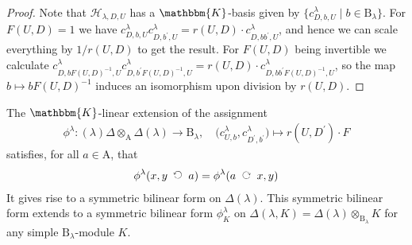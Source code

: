 \documentclass[a4paper,11pt]{amsart}
\newcommand{\actsleft}{\mathop{\,\;\raisebox{1.7ex}{\rotatebox{-90}{$\circlearrowright$}}\;\,}}
\newcommand{\actsright}{\mathop{\,\;\raisebox{0ex}{\rotatebox{90}{$\circlearrowleft$}}\;\,}}
\newcommand{\setstuff}[1]{\mathrm{#1}}
\newcommand{\hcirc}{\otimes}
\newcommand{\KK}{\mathbbm{K}}
\numberwithin{equation}{section}
\begin{document}
\begin{proof}
Note that $\mathcal{H}_{\lambda,D,U}$ 
has a $\KK$-basis given by 
$\{c_{D,b,U}^{\lambda}\mid b\in\setstuff{B}_{\lambda}\}$. 
For $F(U,D)=1$ we have
$c_{D,b,U}^{\lambda}c_{D,b^{\prime},U}^{\lambda}
=r(U,D)\cdot c_{D,bb^{\prime},U}^{\lambda}$, and hence 
we can scale everything by $1/r(U,D)$ to get the result.
For $F(U,D)$ being invertible we calculate 
$c_{D,bF(U,D)^{-1},U}^{\lambda}c_{D,b^{\prime}F(U,D)^{-1},U}^{\lambda}
=r(U,D)\cdot c_{D,bb^{\prime}F(U,D)^{-1},U}^{\lambda}$, 
so the map $b\mapsto bF(U,D)^{-1}$ induces an isomorphism 
upon division by $r(U,D)$.
\end{proof}

\begin{lemma}\label{lemma:bilinearform}
The $\KK$-linear extension 
of the assignment
\begin{gather*}
\phi^{\lambda}\colon
(\lambda)\Delta\hcirc_{\setstuff{A}}
\Delta(\lambda)\to\setstuff{B}_{\lambda}
,\quad
\big(c_{U,b}^{\lambda},c_{D^{\prime},b^{\prime}}^{\lambda}
\big)\mapsto
r(U,D^{\prime})\cdot F
\end{gather*}
satisfies, for all $a\in\setstuff{A}$, that
\begin{gather*}
\phi^{\lambda}
(x,y\actsright a)=
\phi^{\lambda}
(a\actsleft x,y)
\end{gather*}
It gives rise to a symmetric bilinear form on $\Delta(\lambda)$. 
This symmetric bilinear form extends to 
a symmetric bilinear form $\phi^{\lambda}_{K}$
on $\Delta(\lambda,K)=\Delta(\lambda)\hcirc_{\setstuff{B}_{\lambda}}K$ 
for any simple $\setstuff{B}_{\lambda}$-module $K$.
\end{lemma}
\end{document}

